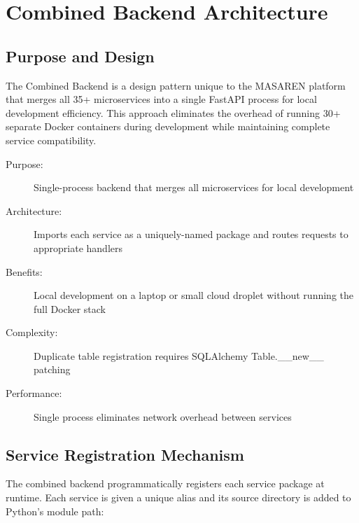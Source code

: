 
\section{Combined Backend Architecture}

\subsection{Purpose and Design}

The Combined Backend is a design pattern unique to the MASAREN platform that merges all 35+ microservices into a single FastAPI process for local development efficiency. This approach eliminates the overhead of running 30+ separate Docker containers during development while maintaining complete service compatibility.

\begin{description}
  \item[Purpose:] Single-process backend that merges all microservices for local development
  \item[Architecture:] Imports each service as a uniquely-named package and routes requests to appropriate handlers
  \item[Benefits:] Local development on a laptop or small cloud droplet without running the full Docker stack
  \item[Complexity:] Duplicate table registration requires SQLAlchemy Table.\_\_new\_\_ patching
  \item[Performance:] Single process eliminates network overhead between services
\end{description}

\subsection{Service Registration Mechanism}

The combined backend programmatically registers each service package at runtime. Each service is given a unique alias and its source directory is added to Python's module path:

